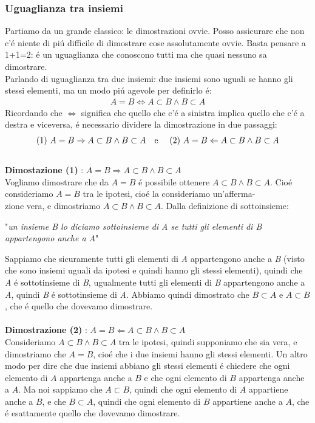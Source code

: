 \documentclass[twoside]{article} %
\begin{document}
	\subsubsection{Uguaglianza tra insiemi}
	Partiamo da un grande classico: le dimostrazioni ovvie. Posso assicurare che non c'\'e niente di pi\'u difficile di dimostrare cose assolutamente ovvie. Basta pensare a 1+1=2: \'e un uguaglianza che conoscono tutti ma che quasi nessuno sa dimostrare.\\	
	Parlando di uguaglianza tra due insiemi: due insiemi sono uguali se hanno gli stessi elementi, ma un modo pi\'u agevole per definirlo \'e:
	\begin{gather*}
		A=B\Leftrightarrow A\subset B \wedge B\subset A
	\end{gather*}
	Ricordando che $\Leftrightarrow$ significa che quello che c'\'e a sinistra implica quello che c'\'e a destra e viceversa, \'e necessario dividere la dimostrazione in due passaggi: 
	\begin{gather*}
		\text{(1) }A=B\Rightarrow A\subset B \wedge B\subset A \text{\quad e \quad(2) } A=B\Leftarrow A\subset B \wedge B\subset A
	\end{gather*}\\
	\textbf{Dimostazione (1) }: $A=B\Rightarrow A\subset B \wedge B\subset A$\\
	Vogliamo dimostrare che da $A=B$ \'e possibile ottenere $A\subset B \wedge B\subset A$. Cio\'e consideriamo $A=B$ tra le ipotesi, cio\'e la consideriamo un'afferma-\\zione vera, e dimostriamo $A\subset B \wedge B\subset A$. Dalla definizione di sottoinsieme: 
	\begin{center}
	"\textit{un insieme B lo diciamo sottoinsieme di A se tutti gli elementi di B appartengono anche a A}"
	\end{center}
	 Sappiamo che sicuramente tutti gli elementi di \textit{A} appartengono anche a \textit{B} (visto che sono insiemi uguali da ipotesi e quindi hanno gli stessi elementi), quindi che \textit{A} \'e sottotinsieme di \textit{B}, ugualmente tutti gli elementi di \textit{B} appartengono anche a \textit{A}, quindi \textit{B} \'e sottotinsieme di \textit{A}. Abbiamo quindi dimostrato che $B\subset A$ e $A\subset B$, che \'e quello che dovevamo dimostrare.\\
	\\\textbf{Dimostrazione (2) }: $A=B\Leftarrow A\subset B \wedge B\subset A$\\
	Consideriamo $A\subset B \wedge B\subset A$ tra le ipotesi, quindi supponiamo che sia vera, e dimostriamo che $A=B$, cio\'e che i due insiemi hanno gli stessi elementi. Un altro modo per dire che due insiemi abbiano gli stessi elementi \'e chiedere che ogni elemento di $A$ appartenga anche a $B$ e che ogni elemento di $B$ appartenga anche a $A$. Ma noi sappiamo che $A\subset B$, quindi che ogni elemento di $A$ appartiene anche a $B$, e che $B\subset A$, quindi che ogni elemento di $B$ appartiene anche a $A$, che \'e esattamente quello che dovevamo dimostrare.\\ \\
\end{document}
